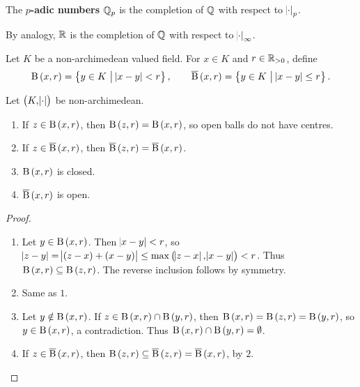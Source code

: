 \begin{definition}
The \textbf{$ p $-adic numbers} $ \mathbb{Q}_p $ is the completion of $ \mathbb{Q} $ with respect to $ \abs{\cdot}_p $.
\end{definition}

\begin{remark*}
By analogy, $ \mathbb{R} $ is the completion of $ \mathbb{Q} $ with respect to $ \abs{\cdot}_\infty $.
\end{remark*}


Let $ K $ be a non-archimedean valued field. For $ x \in K $ and $ r \in \mathbb{R}_{> 0} $, define
$$ \B\br{x, r} = \cbr{y \in K \st \abs{x - y} < r}, \qquad \overline{\B}\br{x, r} = \cbr{y \in K \st \abs{x - y} \le r}. $$

\begin{lemma}
Let $ \br{K, \abs{\cdot}} $ be non-archimedean.
\begin{enumerate}
\item If $ z \in \B\br{x, r} $, then $ \B\br{z, r} = \B\br{x, r} $, so open balls do not have centres.
\item If $ z \in \overline{\B}\br{x, r} $, then $ \overline{\B}\br{z, r} = \overline{\B}\br{x, r} $.
\item $ \B\br{x, r} $ is closed.
\item $ \overline{\B}\br{x, r} $ is open.
\end{enumerate}
\end{lemma}

\begin{proof}
\hfill
\begin{enumerate}
\item Let $ y \in \B\br{x, r} $. Then $ \abs{x - y} < r $, so $ \abs{z - y} = \abs{\br{z - x} + \br{x - y}} \le \max\br{\abs{z - x}, \abs{x - y}} < r $. Thus $ \B\br{x, r} \subseteq \B\br{z, r} $. The reverse inclusion follows by symmetry.
\item Same as $ 1 $.
\item Let $ y \notin \B\br{x, r} $. If $ z \in \B\br{x, r} \cap \B\br{y, r} $, then $ \B\br{x, r} = \B\br{z, r} = \B\br{y, r} $, so $ y \in \B\br{x, r} $, a contradiction. Thus $ \B\br{x, r} \cap \B\br{y, r} = \emptyset $.
\item If $ z \in \overline{\B}\br{x, r} $, then $ \B\br{z, r} \subseteq \overline{\B}\br{z, r} = \overline{\B}\br{x, r} $, by $ 2 $.
\end{enumerate}
\end{proof}


